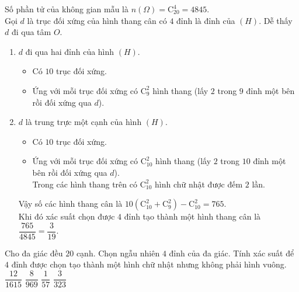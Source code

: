 \begin{vd}
{		\noindent
		Số phần tử của không gian mẫu là $n\left( \Omega\right) =\mathrm{C}_{20}^4=4845$.\\
		Gọi $d$ là trục đối xứng của hình thang cân có $4$ đỉnh là đỉnh của $(H)$. Dễ thấy $d$ đi qua tâm $O$.
		\begin{enumerate}
			\item $d$ đi qua hai đỉnh của hình $(H)$.
			\begin{itemize}
				\item Có $10$ trục đối xứng.
				\item Ứng với mỗi trục đối xứng có $\mathrm{C}_9^2$ hình thang (lấy $2$ trong $9$ đỉnh một bên rồi đối xứng qua $d$).
			\end{itemize}
			\item $d$ là trung trực một cạnh của hình $(H)$.
			\begin{itemize}
				\item Có $10$ trục đối xứng.
				\item Ứng với mỗi trục đối xứng có $\mathrm{C}_{10}^2$ hình thang (lấy $2$ trong $10$ đỉnh một bên rồi đối xứng qua $d$).\\
				Trong các hình thang trên có  $\mathrm{C}_{10}^2$ hình chữ nhật được đếm $2$ lần.
			\end{itemize}	
			Vậy số các hình thang cân là $10\left( \mathrm{C}_{10}^2+\mathrm{C}_9^2\right) -\mathrm{C}_{10}^2=765$.\\
			Khi đó  xác suất chọn được $4$ đỉnh tạo thành một hình thang cân là $\dfrac{765}{4845}=\dfrac{3}{19}$.
		\end{enumerate}
	}
\end{vd}
\begin{bt}%
	Cho đa giác đều $20$ cạnh. Chọn ngẫu nhiên $4$ đỉnh của đa giác. Tính xác suất để $4$ đỉnh được chọn tạo thành một hình chữ nhật nhưng không phải hình vuông.
	\choice
	{$\dfrac{12}{1615}$}
	{\True $\dfrac{8}{969}$}
	{$\dfrac{1}{57}$}
	{$\dfrac{3}{323}$}
\end{bt}

